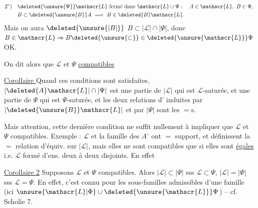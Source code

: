 \[
\begin{aligned}
2^{\circ})\quad &\deleted{\unsure{\Psi}}\mathscr{L}\ \text{fermé dans }\mathscr{L}\cup\Psi:\quad A\in\mathscr{L},\ B\in\Psi,\\
&B\subset\deleted{\unsure{B}}A\ \Longrightarrow\ B\in\deleted{B}\mathscr{L}.
\end{aligned}
\]
Mais on aura $\deleted{\unsure{\lvert B\rvert}}$ $B\subset\lvert\mathscr{L}\rvert\cap\lvert\Psi\rvert$, donc $B\in\mathscr{L}\Rightarrow B\deleted{\unsure{\subset}}\in\deleted{\unsure{\mathscr{L}}}\Psi$ OK.

\uline{} On dit alors que $\mathscr{L}$ et $\Psi$ \uline{compatibles}

\uline{Corollaire } Quand ces conditions sont satisfaites, $\lvert\deleted{A}\mathscr{L}\rvert\cap\lvert\Psi\rvert$ est une partie de $\lvert\mathscr{L}\rvert$ qui est $\mathscr{L}$-saturée, et une partie de $\Psi$ qui est $\Psi$-saturée, et les deux relations d' induites par $\lvert\deleted{\unsure{B}}\mathscr{L}\rvert$ et par $\lvert\Psi\rvert$ sont les $=\mathrm{s}$.

Mais attention, cette dernière condition ne suffit nullement à impliquer que $\mathscr{L}$ et $\Psi$ compatibles. Exemple : $\mathscr{L}$ et la famille  des $A^{\circ}$ ont $=$ support, et définissent la $=$ relation d'équiv. sur $\lvert\mathscr{L}\rvert$, mais elles ne sont compatibles que si elles sont \uline{égales}  i.e. $\mathscr{L}$ formé d'ens. deux à deux disjoints. En effet 

\uline{Corollaire 2} Supposons $\mathscr{L}$ et $\Psi$ compatibles. Alors $\lvert\mathscr{L}\rvert\subset\lvert\Psi\rvert$ sss $\mathscr{L}\subset\Psi$, $\lvert\mathscr{L}\rvert=\lvert\Psi\rvert$ sss $\mathscr{L}=\Psi$.
En effet, c'est connu pour les sous-familles admissibles d'une famille (ici $\unsure{\mathscr{L}|\Phi}\cup\deleted{\unsure{\mathscr{L}}}\Psi$) -- cf. Scholie  7.




